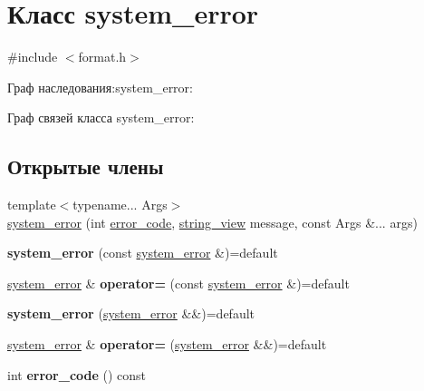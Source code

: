 \hypertarget{classsystem__error}{}\section{Класс system\+\_\+error}
\label{classsystem__error}


{\ttfamily \#include $<$format.\+h$>$}



Граф наследования\+:system\+\_\+error\+:


Граф связей класса system\+\_\+error\+:
\subsection*{Открытые члены}
\begin{DoxyCompactItemize}
\item 
{\footnotesize template$<$typename... Args$>$ }\\\hyperlink{classsystem__error_a6761fd4c8604a59a7c79f6bfdfaf25cb}{system\+\_\+error} (int \hyperlink{classerror__code}{error\+\_\+code}, \hyperlink{classbasic__string__view}{string\+\_\+view} message, const Args \&... args)
\item 
\mbox{\label{classsystem__error_a2186379ae268a19237c14490f47f2d7a}} 
{\bfseries system\+\_\+error} (const \hyperlink{classsystem__error}{system\+\_\+error} \&)=default
\item 
\mbox{\label{classsystem__error_a089787f3f3767761c975ed645494b470}} 
\hyperlink{classsystem__error}{system\+\_\+error} \& {\bfseries operator=} (const \hyperlink{classsystem__error}{system\+\_\+error} \&)=default
\item 
\mbox{\label{classsystem__error_a2b935364ad1420e10498b04b1fd0ed0b}} 
{\bfseries system\+\_\+error} (\hyperlink{classsystem__error}{system\+\_\+error} \&\&)=default
\item 
\mbox{\label{classsystem__error_a3f659b17bf85c47c74c24578c5abb857}} 
\hyperlink{classsystem__error}{system\+\_\+error} \& {\bfseries operator=} (\hyperlink{classsystem__error}{system\+\_\+error} \&\&)=default
\item 
\mbox{\label{classsystem__error_a9c095f54f80c8393f6bf24eb9d188ec4}} 
int {\bfseries error\+\_\+code} () const
\end{DoxyCompactItemize}

